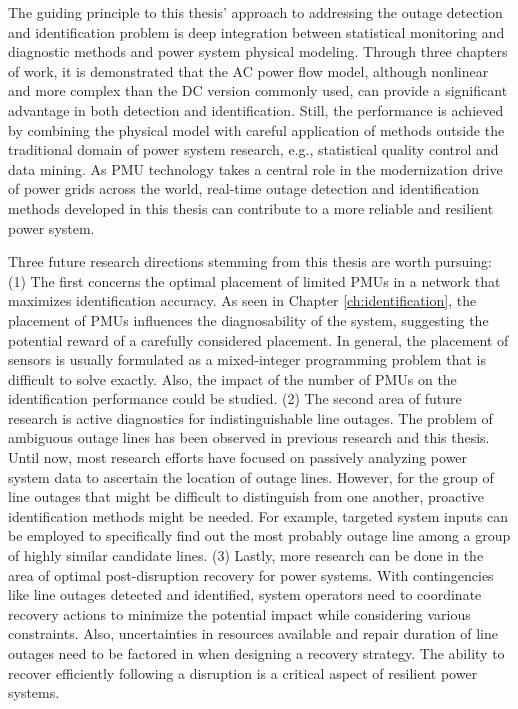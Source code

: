 The guiding principle to this thesis' approach to addressing the outage detection and identification problem is deep integration between statistical monitoring and diagnostic methods and power system physical modeling. Through three chapters of work, it is demonstrated that the AC power flow model, although nonlinear and more complex than the DC version commonly used, can provide a significant advantage in both detection and identification. Still, the performance is achieved by combining the physical model with careful application of methods outside the traditional domain of power system research, e.g., statistical quality control and data mining. As PMU technology takes a central role in the modernization drive of power grids across the world, real-time outage detection and identification methods developed in this thesis can contribute to a more reliable and resilient power system. 

Three future research directions stemming from this thesis are worth pursuing: (1) The first concerns the optimal placement of limited PMUs in a network that maximizes identification accuracy. As seen in Chapter \ref{ch:identification}, the placement of PMUs influences the diagnosability of the system, suggesting the potential reward of a carefully considered placement. In general, the placement of sensors is usually formulated as a mixed-integer programming problem that is difficult to solve exactly. Also, the impact of the number of PMUs on the identification performance could be studied. (2) The second area of future research is active diagnostics for indistinguishable line outages. The problem of ambiguous outage lines has been observed in previous research and this thesis. Until now, most research efforts have focused on passively analyzing power system data to ascertain the location of outage lines. However, for the group of line outages that might be difficult to distinguish from one another, proactive identification methods might be needed. For example, targeted system inputs can be employed to specifically find out the most probably outage line among a group of highly similar candidate lines. (3) Lastly, more research can be done in the area of optimal post-disruption recovery for power systems. With contingencies like line outages detected and identified, system operators need to coordinate recovery actions to minimize the potential impact while considering various constraints. Also, uncertainties in resources available and repair duration of line outages need to be factored in when designing a recovery strategy. The ability to recover efficiently following a disruption is a critical aspect of resilient power systems. 


